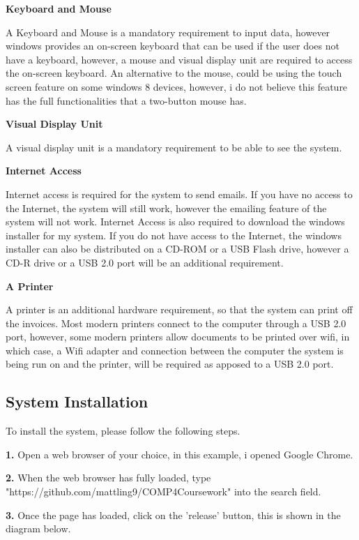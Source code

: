\textbf{Keyboard and Mouse}

A Keyboard and Mouse is a mandatory requirement to input data, however windows provides an on-screen keyboard that can be used if the user does not have a keyboard, however, a mouse and visual display unit are required to access the on-screen keyboard. An alternative to the mouse, could be using the touch screen feature on some windows 8 devices, however, i do not believe this feature has the full functionalities that a two-button mouse has.

\textbf{Visual Display Unit}

A visual display unit is a mandatory requirement to be able to see the system.

\textbf{Internet Access}

Internet access is required for the system to send emails. If you have no access to the Internet, the system will still work, however the emailing feature of the system will not work. Internet Access is also required to download the windows installer for my system. If you do not have access to the Internet, the windows installer can also be distributed on a CD-ROM or a USB Flash drive, however a CD-R drive or a USB 2.0 port will be an additional requirement.

\pagebreak

\textbf{A Printer}

A printer is an additional hardware requirement, so that the system can print off the invoices. Most modern printers connect to the computer through a USB 2.0 port, however, some modern printers allow documents to be printed over wifi, in which case, a Wifi adapter and connection between the computer the system is being run on and the printer, will be required as apposed to a USB 2.0 port.


\pagebreak
\subsection{System Installation}
\label{fig:System Installation}

To install the system, please follow the following steps.

\textbf{1.} Open a web browser of your choice, in this example, i opened Google Chrome.

\textbf{2.} When the web browser has fully loaded, type \newline "https://github.com/mattling9/COMP4Coursework" into the search field.

\textbf{3.} Once the page has loaded, click on the 'release' button, this is shown in the diagram below.

